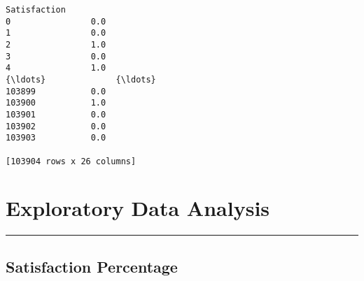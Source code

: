\documentclass[11pt]{article}
\begin{document}
\begin{tcolorbox}[breakable, size=fbox, boxrule=.5pt, pad at break*=1mm, opacityfill=0]
\begin{Verbatim}[commandchars=\\\{\}]
        Satisfaction
0                0.0
1                0.0
2                1.0
3                0.0
4                1.0
{\ldots}              {\ldots}
103899           0.0
103900           1.0
103901           0.0
103902           0.0
103903           0.0

[103904 rows x 26 columns]
\end{Verbatim}
\end{tcolorbox}
        
    \section{Exploratory Data Analysis}\label{exploratory-data-analysis}

\begin{center}\rule{0.5\linewidth}{0.5pt}\end{center}

    \subsection{Satisfaction Percentage}\label{satisfaction-percentage}
\end{document}
